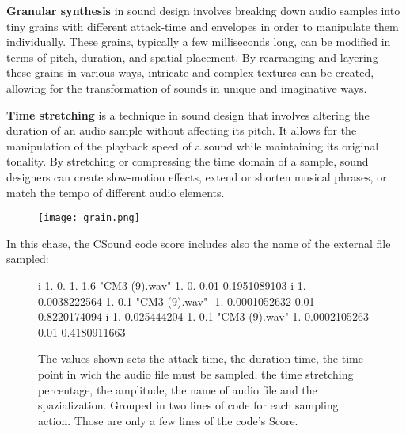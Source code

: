 			\begin{compactitem}
				\item \textbf{Granular synthesis} in sound design involves breaking down audio samples into tiny grains with different attack-time and envelopes in order to manipulate them individually. These grains, typically a few milliseconds long, can be modified in terms of pitch, duration, and spatial placement. By rearranging and layering these grains in various ways, intricate and complex textures can be created, allowing for the transformation of sounds in unique and imaginative ways.
				\item \textbf{Time stretching} is a technique in sound design that involves altering the duration of an audio sample without affecting its pitch. It allows for the manipulation of the playback speed of a sound while maintaining its original tonality. By stretching or compressing the time domain of a sample, sound designers can create slow-motion effects, extend or shorten musical phrases, or match the tempo of different audio elements.
			\end{compactitem}
		
\newpage
		
		\begin{figure}[h]
			\begin{center}
				\texttt{[image: grain.png]}
			\end{center}
		\end{figure}			
		
		In this chase, the CSound code score includes also the name of the external file sampled:
		
\begin{figure}[h]
	\begin{code}
i          1.                    0.                    1.                    1.6         	"CM3 (9).wav"          1.                    0.                    0.01                  0.1951089103
i          1.                    0.0038222564          1.                    0.1         	"CM3 (9).wav"         -1.                    0.0001052632          0.01                  0.8220174094
i          1.                    0.025444204           1.                    0.1         	"CM3 (9).wav"          1.                    0.0002105263          0.01                  0.4180911663
	\end{code}
	\caption{The values shown sets the attack time, the duration time, the time point in wich the audio file must be sampled, the time stretching percentage, the amplitude, the name of audio file and the spazialization. Grouped in two lines of code for each sampling action. Those are only a few lines of the code's Score.}
\end{figure}

